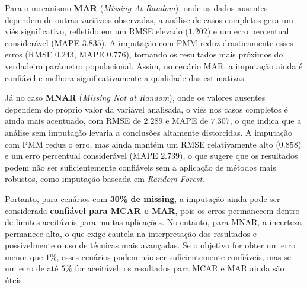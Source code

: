\documentclass{article}
\begin{document}
Para o mecanismo \textbf{MAR} (\textit{Missing At Random}), onde os dados ausentes dependem de outras variáveis observadas, a análise de casos completos gera um viés significativo, refletido em um RMSE elevado ($1.202$) e um erro percentual considerável (MAPE $3.835$). A imputação com PMM reduz drasticamente esses erros (RMSE $0.243$, MAPE $0.776$), tornando os resultados mais próximos do verdadeiro parâmetro populacional. Assim, no cenário MAR, a imputação ainda é confiável e melhora significativamente a qualidade das estimativas.

Já no caso \textbf{MNAR} (\textit{Missing Not at Random}), onde os valores ausentes dependem do próprio valor da variável analisada, o viés nos casos completos é ainda mais acentuado, com RMSE de $2.289$ e MAPE de $7.307$, o que indica que a análise sem imputação levaria a conclusões altamente distorcidas. A imputação com PMM reduz o erro, mas ainda mantém um RMSE relativamente alto ($0.858$) e um erro percentual considerável (MAPE $2.739$), o que sugere que os resultados podem não ser suficientemente confiáveis sem a aplicação de métodos mais robustos, como imputação baseada em \textit{Random Forest}.

Portanto, para cenários com \textbf{30\% de missing}, a imputação ainda pode ser considerada \textbf{confiável para MCAR e MAR}, pois os erros permanecem dentro de limites aceitáveis para muitas aplicações. No entanto, para MNAR, a incerteza permanece alta, o que exige cautela na interpretação dos resultados e possivelmente o uso de técnicas mais avançadas. Se o objetivo for obter um erro menor que $1\%$, esses cenários podem não ser suficientemente confiáveis, mas se um erro de até $5\%$ for aceitável, os resultados para MCAR e MAR ainda são úteis.
\end{document}
